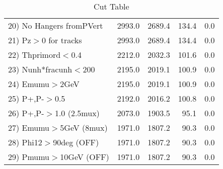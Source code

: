 \begin{table}[h!]
\begin{tabular}{||l||r|r|r|r||}
 20) No Hangers fromPVert &      2993.0 &      2689.4 &       134.4 &         0.0 \\
 21) Pz$>$0 for tracks    &      2993.0 &      2689.4 &       134.4 &         0.0 \\
 22) Thprimord$<$0.4      &      2212.0 &      2032.3 &       101.6 &         0.0 \\
 23) Nunh*fracunh$<$200   &      2195.0 &      2019.1 &       100.9 &         0.0 \\
 24) Emumu$>$2GeV         &      2195.0 &      2019.1 &       100.9 &         0.0 \\
 25) P+,P-$>$0.5          &      2192.0 &      2016.2 &       100.8 &         0.0 \\
 26) P+,P-$>$1.0 (2.5mux) &      2073.0 &      1903.5 &        95.1 &         0.0 \\
 27) Emumu$>$5GeV  (8mux) &      1971.0 &      1807.2 &        90.3 &         0.0 \\
 28) Phi12$>$90deg  (OFF) &      1971.0 &      1807.2 &        90.3 &         0.0 \\
 29) Pmumu$>$10GeV  (OFF) &      1971.0 &      1807.2 &        90.3 &         0.0 \\
 \hline
 \hline
 \end{tabular}
 \caption{Cut Table \cohrp  }
 \label{tab-cut_crhop}
 \end{table}
